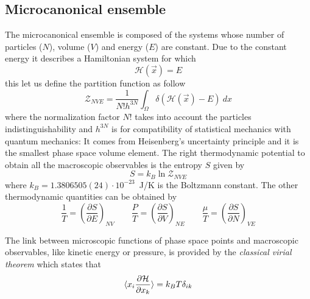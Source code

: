 \subsection{Microcanonical ensemble}
The microcanonical ensemble is composed of the systems whose number of particles ($N$), volume ($V$) and energy ($E$) are constant. Due to the constant energy it describes a Hamiltonian system for which
\begin{equation*}
	\mathcal{H}(\vec x) = E
\end{equation*}
this let us define the partition function as follow
\begin{equation}
	\mathcal{Z}_{NVE} = \frac{1}{N!h^{3N}}\int_\Omega \delta(\mathcal{H}(\vec x) - E)\ dx
	\label{eq:micropartition}
\end{equation}
where the normalization factor $N!$ takes into account the particles indistinguishability and $h^{3N}$ is for compatibility of statistical mechanics with quantum mechanics: It comes from Heisenberg’s uncertainty principle and it is the smallest phase space volume element. The right thermodynamic potential to obtain all the macroscopic observables is the entropy $S$ given by
\begin{equation*}
	S = k_B \ln \mathcal{Z}_{NVE}
\end{equation*}
where $k_B = 1.3806505(24) \cdot 10^{-23}$~J/K is the Boltzmann constant. The other thermodynamic quantities can be obtained by
\begin{equation*}
	\frac{1}{T} = \left ( \frac{\partial S}{\partial E}\right )_{NV} \qquad \frac{P}{T} = \left ( \frac{\partial S}{\partial V}\right )_{NE} \qquad \frac{\mu}{T} = \left ( \frac{\partial S}{\partial N}\right )_{VE}
\end{equation*}

The link between microscopic functions of phase space points and macroscopic observables, like kinetic energy or pressure, is provided by the \textit{classical virial theorem} which states that
\begin{equation}
	\langle x_i\frac{\partial\mathcal{H}}{\partial x_k} \rangle = k_B T \delta_{ik}
	\label{eq:virial}
\end{equation}

